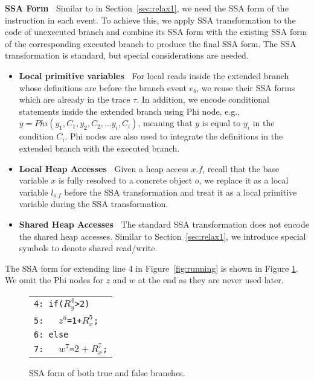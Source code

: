 {\bf SSA Form\ }  Similar to in Section~\ref{sec:relax1}, we need the SSA 
form of the instruction in each event. To achieve this, we apply SSA 
transformation to the code of unexecuted branch and combine its SSA form 
with the existing SSA form of the corresponding executed branch to produce the final 
SSA form. The SSA transformation is standard, but special considerations
are needed.
\begin{itemize}
\item {\bf Local primitive variables\ }  
For local reads inside the extended branch whose definitions are
before the branch event $e_b$, we reuse their SSA forms which 
are already in the trace $\tau$.
In addition, 
we encode conditional statements inside the extended branch using
Phi node, e.g., $y=Phi(y_1, C_1, y_2, C_2, \dots y_i, C_i)$, 
meaning that $y$ is equal to $y_i$ in the condition $C_i$.
Phi nodes are also used to integrate the definitions in the extended
branch with the executed branch.

\item {\bf Local Heap Accesses\ } Given a heap access  $x.f$, 
recall that the base variable $x$ is fully resolved to a concrete object
 $o$, we replace it as a local variable $l_{o.f}$ before the SSA 
transformation and treat it as a local primitive variable during the 
SSA transformation.
 
\item {\bf Shared Heap Accesses\ } The standard SSA transformation 
does not encode the shared heap accesses. Similar to 
Section~\ref{sec:relax1}, we introduce special symbols to 
denote shared read/write.
\end{itemize}

The SSA form for extending line 4 in Figure~\ref{fig:running}  is shown 
in Figure \ref{fig:pathssa}. We omit the Phi nodes for $z$ and $w$ at 
the end as they are never used later. 


\begin{figure}
\centering
\begin{tabular}{l}
 {\tt 4: if($R^4_y$>2)}  \\ %
{\tt 5: \ \ $z^5$=1+$R^5_x$;}   \\%
 {{\tt 6:  else}}   \\ %
 {{\tt 7: \ \ $w^7$=$2+R^{7}_{x}$;}}  \\ %
\end{tabular}
\caption{SSA form of both true and false branches. }
\label{fig:pathssa}
\end{figure}






